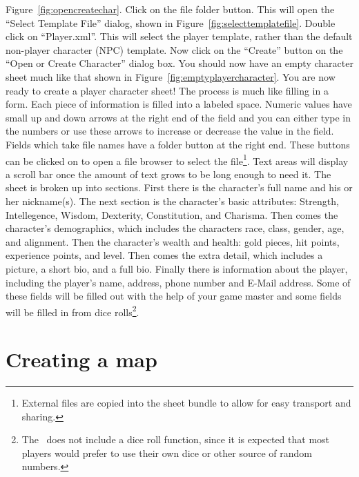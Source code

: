 Figure~\ref{fig:opencreatechar}.  Click on the file folder button. 
This will open the ``Select Template File'' dialog, shown in
Figure~\ref{fig:selecttemplatefile}. Double click on ``Player.xml''. 
This will select the player template, rather than the default
non-player character (NPC) template.  Now click on the ``Create''
button on the ``Open or Create Character'' dialog box.  You should now
have an empty character sheet much like that shown in
Figure~\ref{fig:emptyplayercharacter}. You are now ready to create a
player character sheet!  The process is much like filling in a form.
Each piece of information is filled into a labeled space.  Numeric
values have small up and down arrows at the right end of the field and
you can either type in the numbers or use these arrows to increase or
decrease the value in the field.  Fields which take file names have a
folder button at the right end.  These buttons can be clicked on to
open a file browser to select the file\footnote{External files are
copied into the sheet bundle to allow for easy transport and sharing.}.
 Text areas will display a scroll bar once the amount of text grows to
be long enough to need it. The sheet is broken up into sections.  First
there is the character's full name and his or her nickname(s).  The
next section is the character's basic attributes: Strength,
Intellegence, Wisdom, Dexterity, Constitution, and Charisma.  Then
comes the character's demographics, which includes the characters race,
class, gender, age, and alignment.  Then the character's wealth and
health: gold pieces, hit points, experience points, and level.  Then
comes the extra detail, which includes a picture, a short bio, and a
full bio.  Finally there is information about the player, including the
player's name, address, phone number and E-Mail address.  Some of these
fields will be filled out with the help of your game master and some
fields will be filled in from dice rolls\footnote{The \thesystem\  does
not include a dice roll function, since it is expected that most
players would prefer to use their own dice or other source of random
numbers.}.

\section{Creating a map}


